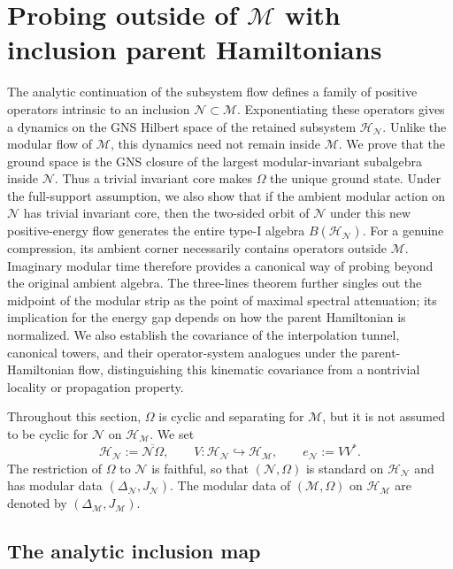 \documentclass[a4paper,11pt]{article}
\theoremstyle{definition}
\newcommand{\mN}{\mathcal{N}}
\newcommand{\mH}{\mathcal{H}}
\newcommand{\mM}{\mathcal{M}}
\begin{document}
\section{Probing outside of $\mM$ with inclusion parent Hamiltonians}
\label{sec:probing-outside-M}

The analytic continuation of the subsystem flow defines a family of positive
operators intrinsic to an inclusion $\mN\subset \mM$. Exponentiating these operators gives a dynamics on the GNS
Hilbert space of the retained subsystem $\mH_{\mN}$. Unlike the modular flow of
$\mM$, this dynamics need not remain inside $\mM$. We prove that the ground space is the GNS closure of the
largest modular-invariant subalgebra inside $\mN$. Thus a trivial invariant
core makes $\Omega$ the unique ground state. Under the full-support
assumption, we also show
that if the ambient modular action on $\mN$ has trivial invariant core, then
the two-sided orbit of $\mN$ under this new positive-energy flow
generates the entire type-I algebra $B(\mH_{\mN})$. For a genuine compression,
its ambient corner necessarily contains operators outside $\mM$. Imaginary modular time therefore
provides a canonical way of probing beyond the original ambient algebra.
The three-lines theorem further singles out the midpoint of the modular strip
as the point of maximal spectral attenuation; its implication for the energy
gap depends on how the parent Hamiltonian is normalized. We also establish
the covariance of the interpolation tunnel, canonical towers, and their
operator-system analogues under the parent-Hamiltonian flow, distinguishing
this kinematic covariance from a nontrivial locality or propagation property.

Throughout this section, $\Omega$ is cyclic and separating for
$\mM$, but it is not assumed to be cyclic for $\mN$ on
$\mH_{\mM}$. We set
\begin{equation}
    \mH_{\mN}
    :=
    \overline{\mN\Omega},
    \qquad
    V:\mH_{\mN}\hookrightarrow\mH_{\mM},
    \qquad
    e_{\mN}:=VV^* .
    \label{eq:probing-HN}
\end{equation}
The restriction of $\Omega$ to $\mN$ is faithful, so that
$(\mN,\Omega)$ is standard on $\mH_{\mN}$ and has modular data
$(\Delta_{\mN},J_{\mN})$. The modular data of $(\mM,\Omega)$ on
$\mH_{\mM}$ are denoted by $(\Delta_{\mM},J_{\mM})$.

\subsection{The analytic inclusion map}
\end{document}
